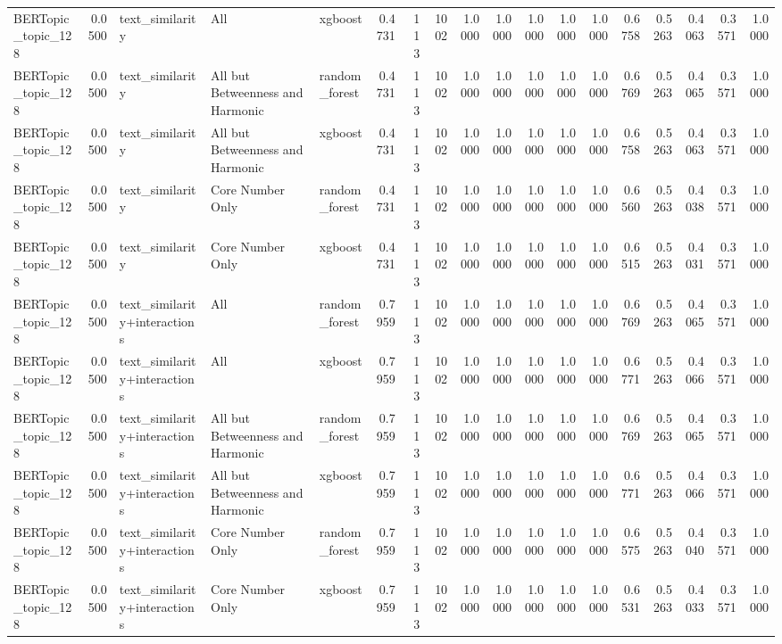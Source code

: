 \begin{tabular}{lrlllrrrrrrrrrrrrr}
BERTopic_topic_128 & 0.0500 & text_similarity & All & xgboost & 0.4731 & 113 & 1002 & 1.0000 & 1.0000 & 1.0000 & 1.0000 & 1.0000 & 0.6758 & 0.5263 & 0.4063 & 0.3571 & 1.0000 \\
BERTopic_topic_128 & 0.0500 & text_similarity & All but Betweenness and Harmonic & random_forest & 0.4731 & 113 & 1002 & 1.0000 & 1.0000 & 1.0000 & 1.0000 & 1.0000 & 0.6769 & 0.5263 & 0.4065 & 0.3571 & 1.0000 \\
BERTopic_topic_128 & 0.0500 & text_similarity & All but Betweenness and Harmonic & xgboost & 0.4731 & 113 & 1002 & 1.0000 & 1.0000 & 1.0000 & 1.0000 & 1.0000 & 0.6758 & 0.5263 & 0.4063 & 0.3571 & 1.0000 \\
BERTopic_topic_128 & 0.0500 & text_similarity & Core Number Only & random_forest & 0.4731 & 113 & 1002 & 1.0000 & 1.0000 & 1.0000 & 1.0000 & 1.0000 & 0.6560 & 0.5263 & 0.4038 & 0.3571 & 1.0000 \\
BERTopic_topic_128 & 0.0500 & text_similarity & Core Number Only & xgboost & 0.4731 & 113 & 1002 & 1.0000 & 1.0000 & 1.0000 & 1.0000 & 1.0000 & 0.6515 & 0.5263 & 0.4031 & 0.3571 & 1.0000 \\
BERTopic_topic_128 & 0.0500 & text_similarity+interactions & All & random_forest & 0.7959 & 113 & 1002 & 1.0000 & 1.0000 & 1.0000 & 1.0000 & 1.0000 & 0.6769 & 0.5263 & 0.4065 & 0.3571 & 1.0000 \\
BERTopic_topic_128 & 0.0500 & text_similarity+interactions & All & xgboost & 0.7959 & 113 & 1002 & 1.0000 & 1.0000 & 1.0000 & 1.0000 & 1.0000 & 0.6771 & 0.5263 & 0.4066 & 0.3571 & 1.0000 \\
BERTopic_topic_128 & 0.0500 & text_similarity+interactions & All but Betweenness and Harmonic & random_forest & 0.7959 & 113 & 1002 & 1.0000 & 1.0000 & 1.0000 & 1.0000 & 1.0000 & 0.6769 & 0.5263 & 0.4065 & 0.3571 & 1.0000 \\
BERTopic_topic_128 & 0.0500 & text_similarity+interactions & All but Betweenness and Harmonic & xgboost & 0.7959 & 113 & 1002 & 1.0000 & 1.0000 & 1.0000 & 1.0000 & 1.0000 & 0.6771 & 0.5263 & 0.4066 & 0.3571 & 1.0000 \\
BERTopic_topic_128 & 0.0500 & text_similarity+interactions & Core Number Only & random_forest & 0.7959 & 113 & 1002 & 1.0000 & 1.0000 & 1.0000 & 1.0000 & 1.0000 & 0.6575 & 0.5263 & 0.4040 & 0.3571 & 1.0000 \\
BERTopic_topic_128 & 0.0500 & text_similarity+interactions & Core Number Only & xgboost & 0.7959 & 113 & 1002 & 1.0000 & 1.0000 & 1.0000 & 1.0000 & 1.0000 & 0.6531 & 0.5263 & 0.4033 & 0.3571 & 1.0000 \\

\end{tabular}
